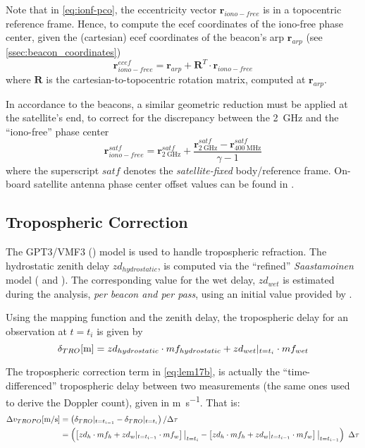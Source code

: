 Note that in \autoref{eq:ionf-pco}, the eccentricity vector $\bm{r}_{iono-free}$ 
is in a topocentric reference frame. Hence, to compute the \gls{ecef} coordinates of the 
iono-free phase center, given the (cartesian) \gls{ecef} coordinates of the beacon's 
\gls{arp} $\bm{r}_{arp}$ (see \ref{ssec:beacon_coordinates})
\begin{equation}
  \bm{r}^{ecef}_{iono-free} = \bm{r}_{arp} + \bm{R}^T \cdot \bm{r}_{iono-free}
  \label{eq:arp-to-if-pc}
\end{equation}
where $\bm{R}$ is the cartesian-to-topocentric rotation matrix, computed 
at $\bm{r}_{arp}$.

In accordance to the beacons, a similar geometric reduction must be applied 
at the satellite's end, to correct for the discrepancy between the \SI{2}{\GHz} 
and the ``iono-free'' phase center
\begin{equation}
  \bm{r}^{satf}_{iono-free} = \bm{r}^{satf}_{\SI{2}{\GHz}} + 
    \frac{\bm{r}^{satf}_{\SI{2}{\GHz}} - 
    \bm{r}^{satf}_{\SI{400}{\MHz}}}{\gamma - 1}
\end{equation}
where the superscript $satf$ denotes the \emph{satellite-fixed} body/reference 
frame. On-board satellite antenna phase center offset values can be found in 
\cite{Cerri2022}.

\subsection{Tropospheric Correction}\label{ssec-tropospheric-correction}
The GPT3/VMF3 (\cite{Landskron2018}) model is used to handle tropospheric refraction. 
The hydrostatic zenith delay $zd_{hydrostatic}$, is computed via the ``refined'' 
\emph{Saastamoinen} model (\cite{Davis1985} and \cite{Saastamoinen1972}). 
The corresponding value for the wet delay, $zd_{wet}$ is estimated during the 
analysis, \emph{per beacon and per pass}, using an initial value provided by 
\cite{Askne1987}.

Using the mapping function and the zenith delay, the tropospheric 
delay for an observation at $t=t_i$ is given by
\begin{equation}\label{eq:tropo-delay}
  \delta _{TRO} [\si{\m}] = zd_{hydrostatic} \cdot mf_{hydrostatic} + zd_{wet}\at{t=t_i} \cdot mf_{wet}
\end{equation}

The tropospheric correction term in \autoref{eq:lem17b}, is actually the ``time-differenced'' 
tropospheric delay between two measurements (the same ones used to derive the 
Doppler count), given in \si{\m \per \s}. That is:
\begin{equation}\label{eq:dtrop-diff}
  \begin{aligned}
    \Delta v_{TROPO} [\si{\m \per \s}] 
      &= \left( \delta _{TRO} \at{t=t_{i-1}} - \delta _{TRO} \at{t=t_{i}} \right) / \Delta \tau\\
      &= \left( \left[ zd_{h} \cdot mf_{h} + zd_{w}\at{t=t_{i-1}} \cdot mf_{w} \right]\at[\big]{t=t_i} - 
        \left[ zd_{h} \cdot mf_{h} + zd_{w}\at{t=t_{i-1}} \cdot mf_{w} \right]\at[\big]{t=t_{i-1}} \right) \ \Delta \tau
  \end{aligned}
\end{equation}

